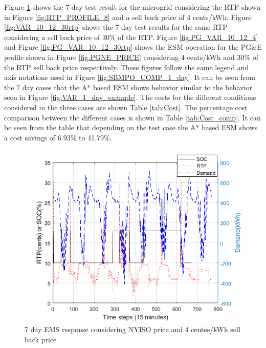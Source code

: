 Figure \ref{fig:VAR_10_12_4} shows the 7 day test result for the microgrid considering the RTP shown in Figure \ref{fig:RTP_PROFILE_8} and a sell back price of 4 cents/kWh. Figure \ref{fig:VAR_10_12_30rtp} shows the 7 day test results for the same RTP considering a sell back price of 30\% of the RTP. Figure \ref{fig:PG_VAR_10_12_4} and Figure \ref{fig:PG_VAR_10_12_30rtp} shows the ESM operation for the PG\&E profile shown in Figure \ref{fig:PGNE_PRICE} considering 4 cents/kWh and 30\% of the RTP sell back price respectively. These figures follow the same legend and axis notations used in Figure \ref{fig:SBMPO_COMP_1_day}. It can be seen from the 7 day cases that the A* based ESM shows behavior similar to the behavior seen in  Figure \ref{fig:VAR_1_day_example}. The costs for the different conditions considered in the three cases are shown  Table \ref{tab:Cost}. The percentage cost comparison between the different cases is shown in Table \ref{tab:Cost_comp}. It can be seen from the table that depending on the test case the A* based ESM shows a cost savings of 6.93\% to 41.79\%. 
 \begin{figure}[!ht]
    \centering
    \includegraphics[width = \linewidth]{figs/VAR_10_12_4.png}
    \caption{7 day EMS response considering NYISO price and 4 centes/kWh sell back price}
    \label{fig:VAR_10_12_4}
\end{figure}

